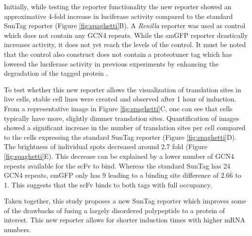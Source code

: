 Initially, while testing the reporter functionality the new reporter showed an approximative 4-fold increase in luciferase activity compared to the standard SunTag reporter (Figure \ref{fig:spaghetti}B).
A \textit{Renilla} reporter was used as control which does not contain any GCN4 repeats.
While the smGFP reporter drastically increases activity, it does not yet reach the levels of the control.
It must be noted that the control also construct does not contain a proteotuner tag which has lowered the luciferase activity in previous experiments by enhancing the degradation of the tagged protein \cite{bonger_small_2011}.

To test whether this new reporter allows the visualization of translation sites in live cells, stable cell lines were created and observed after 1 hour of induction.
From a representative image in Figure \ref{fig:spaghetti}C, one can see that cells typically have more, slightly dimmer translation sites.
Quantification of images showed a significant increase in the number of translation sites per cell compared to the cells expressing the standard SunTag reporter (Figure \ref{fig:spaghetti}D).
The brightness of individual spots decreased around 2.7 fold (Figure \ref{fig:spaghetti}E).
This decrease can be explained by a lower number of GCN4 repeats available for the scFv to bind.
Whereas the standard SunTag has 24 GCN4 repeats, smGFP only has 9 leading to a binding site difference of 2.6$\overline{\mbox{6}}$ to 1.
This suggests that the scFv binds to both tags with full occupancy.

Taken together, this study proposes a new SunTag reporter which improves some of the drawbacks of fusing a largely disordered polypeptide to a protein of interest.
This new reporter allows for shorter induction times with higher mRNA numbers.

